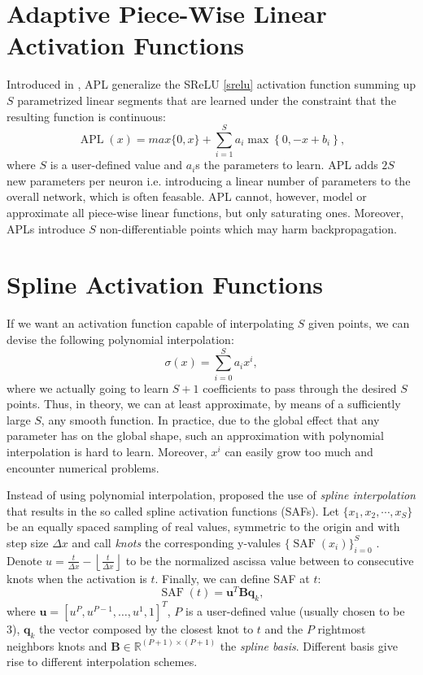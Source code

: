 \documentclass[LaM,binding=0.6cm]{./packages/sapthesis/sapthesis}
\begin{document}
    \section{Adaptive Piece-Wise Linear Activation Functions}
            Introduced in \cite{agostinelli2014learning}, APL generalize the SReLU \ref{srelu} activation function summing up $S$ parametrized linear segments that are
            learned under the constraint that the resulting function is continuous:
            \begin{equation}
                \operatorname{APL}(x) = max \{0, x\} + \sum_{i=1}^{S} a_{i} \max \left\{0,-x+b_{i}\right\},
            \end{equation}
            where $S$ is a user-defined value and $a_i$s the parameters to learn. APL adds $2S$ new parameters per neuron i.e. introducing a linear number of parameters to the overall network, which is often feasable.
            APL cannot, however, model or approximate all piece-wise linear functions, but only saturating ones. Moreover, APLs introduce $S$ non-differentiable points which may harm backpropagation.
    \section{Spline Activation Functions}
    If we want an activation function capable of interpolating $S$ given points, we can devise the following polynomial interpolation:
    \begin{equation}
        \sigma(x) = \sum_{i=0}^{S} a_{i} x^{i},
    \end{equation}
    where we actually going to learn $S+1$ coefficients to pass through the desired $S$ points. Thus, in theory, we can at least approximate, by means of
    a sufficiently large $S$, any smooth function. In practice, due to the global effect that any parameter has on the global shape, such an approximation with polynomial interpolation
    is hard to learn. Moreover, $x^i$ can easily grow too much and encounter numerical problems.
    
    Instead of using polynomial interpolation, \cite{saf} proposed the use of \textit{spline interpolation} that results in the so called spline activation functions (SAFs).
    Let $\{ x_1, x_2, \cdots, x_S \}$ be an equally spaced sampling of real values, symmetric to the origin and with step size $\Delta x$ and call \textit{knots}
    the corresponding y-valules $\{\operatorname{SAF}(x_i)\}^S_{i=0}$ . Denote $u=\frac{t}{\Delta x}-\left\lfloor\frac{t}{\Delta x}\right\rfloor$ to be the normalized ascissa 
    value between to consecutive knots when the activation is $t$. Finally, we can define SAF at $t$:
    \begin{equation}
        \label{saf}
        \operatorname{SAF}(t)=\mathbf{u}^{T} \mathbf{B} \mathbf{q}_{k},
    \end{equation}
    where $\mathbf{u}=\left[u^{P}, u^{P-1}, \ldots, u^{1}, 1\right]^{T}$, $P$ is a user-defined value (usually chosen to be 3), $\mathbf{q}_{k}$ the vector composed by
    the closest knot to $t$ and the $P$ rightmost neighbors knots and $\mathbf{B} \in \mathbb{R}^{(P+1) \times(P+1)}$ the \textit{spline basis}. Different basis give 
    rise to different interpolation schemes.
    
\end{document}
